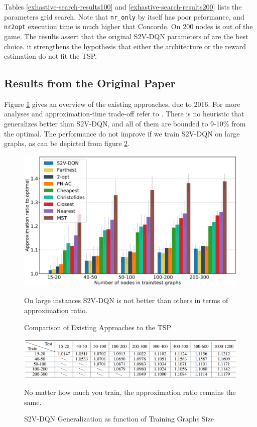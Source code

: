 \documentclass[10pt,a4paper,draft]{article}
\begin{document}
Tables \ref{exhastive-search-results100} and \ref{exhastive-search-results200} lists the parameters grid search. Note that \texttt{nr\_only} by itself has poor peformance, and \texttt{nr2opt} execution time is much higher that Concorde. On 200 nodes \cite{deudon18-tsp-nr2opt} is out of the game. The results assert that the original S2V-DQN parameters of \cite{dai17-tsp-s2v} are the best choice. it strengthens the hypothesis that either the architecture or the reward estimation do not fit the TSP.

\subsection{Results from the Original Paper}
Figure \ref{im_paper_aprx_comp} gives an overview of the existing approaches, due to 2016. For more analyses and approximation-time trade-off refer to \cite{dai17-tsp-s2v}. There is no heuristic that generalizes better than S2V-DQN, and all of them are bounded to 9-10\% from the optimal. The performance do not improve if we train S2V-DQN on large graphs, as can be depicted from figure \ref{im_paper_aprx_vs_trainsize}.

\begin{figure}[h]
	\centering
	\includegraphics[width=1\textwidth]{tsp_paper_res_comp.eps}	
	\medskip
	\caption{Comparison of Existing Approaches to the TSP}
	\small On large instances S2V-DQN is not better than others in terms of approximation ratio.
	\label{im_paper_aprx_comp}
\end{figure}
\begin{figure}[h]
	\centering
	\includegraphics[width=1\textwidth]{tsp_paper_res_table.eps}
	\caption{S2V-DQN Generalization as function of Training Graphs Size}
	\small No matter how much you train, the approximation ratio remains the same.
	\medskip
	\label{im_paper_aprx_vs_trainsize}
\end{figure}	
\end{document}
